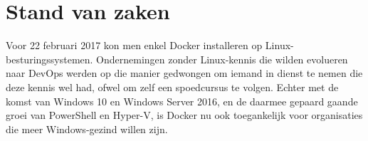 \chapter{Stand van zaken}
\label{ch:stand-van-zaken}






Voor 22 februari 2017 kon men enkel Docker installeren op Linux-besturingssystemen. Ondernemingen zonder Linux-kennis die wilden evolueren naar DevOps werden op die manier gedwongen om iemand in dienst te nemen die deze kennis wel had, ofwel om zelf een spoedcursus te volgen. Echter met de komst van Windows 10 en Windows Server 2016, en de daarmee gepaard gaande groei van PowerShell en Hyper-V, is Docker nu ook toegankelijk voor organisaties die meer Windows-gezind willen zijn. \autocite{Brown2017}

